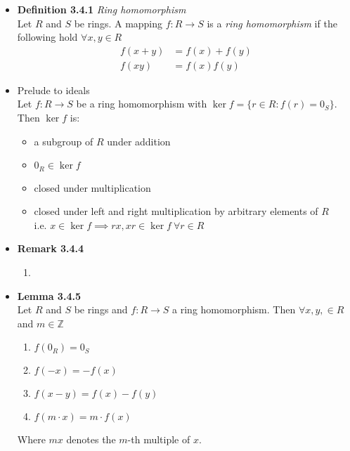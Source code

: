 \documentclass[11pt,a4paper]{article}
\begin{document}
\begin{itemize}

    \item \textbf{Definition 3.4.1} \emph{Ring homomorphism} \\
        Let $R$ and $S$ be rings.
        A mapping $f : R \to S$ is a \emph{ring homomorphism} if the following hold
        $\forall x,y\in R$
        \begin{align*}{}
            f(x+y) & = f(x) + f(y) \\
            f(xy)  & = f(x)f(y)
        \end{align*}

    \item Prelude to ideals \\
        Let $f : R \to S$ be a ring homomorphism with $\ker f = \{ r \in R : f(r) = 0_S \}$.
        Then $\ker f$ is:
        \begin{itemize}
            \item a subgroup of $R$ under addition
            \item $0_R \in \ker f$
            \item closed under multiplication
            \item closed under left and right multiplication by arbitrary elements of $R$ \\
                i.e. $x \in \ker f \implies rx, xr \in \ker f \ \forall r \in R$
        \end{itemize}

    \item \textbf{Remark 3.4.4}
        \begin{enumerate}
            \item
        \end{enumerate}

    \item \textbf{Lemma 3.4.5} \\
        Let $R$ and $S$ be rings and $f : R \to S$ a ring homomorphism.
        Then $\forall x,y, \in R$ and $m \in \mathbb{Z}$
        \begin{enumerate}
            \item $f(0_R)       = 0_S$
            \item $f(-x)        = -f(x)$
            \item $f(x-y)       = f(x) - f(y)$
            \item $f(m \cdot x) = m\cdot f(x)$
        \end{enumerate}
        Where $mx$ denotes the $m$-th multiple of $x$.


\end{itemize}
\end{document}
